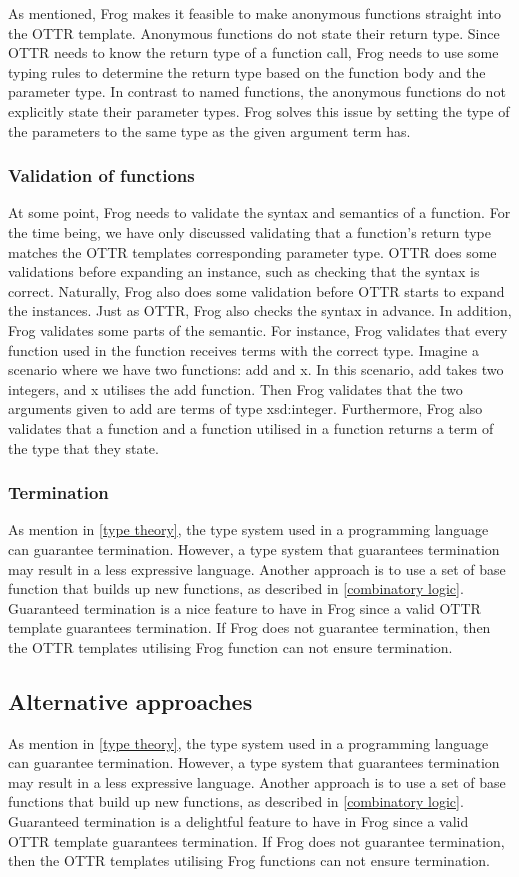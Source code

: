 \para 
As mentioned, Frog makes it feasible to make anonymous functions straight into the OTTR template. Anonymous functions do not state their return type. Since OTTR needs to know the return type of a function call, Frog needs to use some typing rules to determine the return type based on the function body and the parameter type. In contrast to named functions, the anonymous functions do not explicitly state their parameter types. Frog solves this issue by setting the type of the parameters to the same type as the given argument term has. 

\subsubsection{Validation of functions}
At some point, Frog needs to validate the syntax and semantics of a function. For the time being, we have only discussed validating that a function's return type matches the OTTR templates corresponding parameter type. OTTR does some validations before expanding an instance, such as checking that the syntax is correct. Naturally, Frog also does some validation before OTTR starts to expand the instances. Just as OTTR, Frog also checks the syntax in advance. In addition, Frog validates some parts of the semantic. For instance, Frog validates that every function used in the function receives terms with the correct type. Imagine a scenario where we have two functions: add and x. In this scenario, add takes two integers, and x utilises the add function. Then Frog validates that the two arguments given to add are terms of type xsd:integer. Furthermore, Frog also validates that a function and a function utilised in a function returns a term of the type that they state.

\subsubsection{Termination}
As mention in \autoref{type theory}, the type system used in a programming language can guarantee termination. However, a type system that guarantees termination may result in a less expressive language. Another approach is to use a set of base function that builds up new functions, as described in \autoref{combinatory logic}. Guaranteed termination is a nice feature to have in Frog since a valid OTTR template guarantees termination. If Frog does not guarantee termination, then the OTTR templates utilising Frog function can not ensure termination. 

\subsection{Alternative approaches}
As mention in \autoref{type theory}, the type system used in a programming language can guarantee termination. However, a type system that guarantees termination may result in a less expressive language. Another approach is to use a set of base functions that build up new functions, as described in \autoref{combinatory logic}. Guaranteed termination is a delightful feature to have in Frog since a valid OTTR template guarantees termination. If Frog does not guarantee termination, then the OTTR templates utilising Frog functions can not ensure termination.

